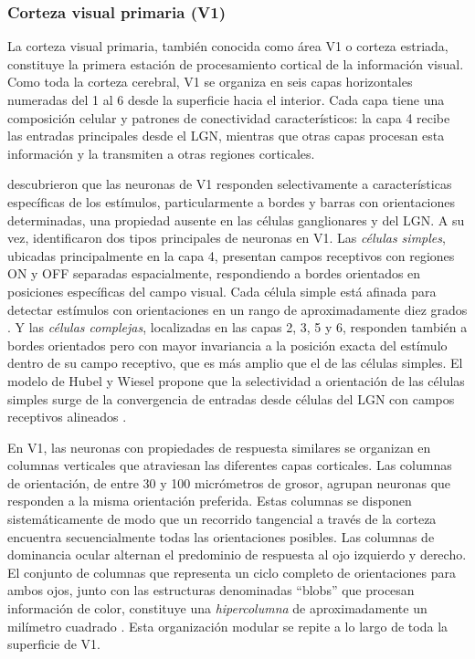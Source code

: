 \subsubsection{Corteza visual primaria (V1)}

La corteza visual primaria, también conocida como área V1 o corteza estriada, constituye la primera estación de procesamiento cortical de la información visual. Como toda la corteza cerebral, V1 se organiza en seis capas horizontales numeradas del 1 al 6 desde la superficie hacia el interior. Cada capa tiene una composición celular y patrones de conectividad característicos: la capa 4 recibe las entradas principales desde el LGN, mientras que otras capas procesan esta información y la transmiten a otras regiones corticales.

\citet{hubel1959receptive} descubrieron que las neuronas de V1 responden selectivamente a características específicas de los estímulos, particularmente a bordes y barras con orientaciones determinadas, una propiedad ausente en las células ganglionares y del \acrshort{LGN}. A su vez, identificaron dos tipos principales de neuronas en V1. Las \textit{células simples}, ubicadas principalmente en la capa 4, presentan campos receptivos con regiones ON y OFF separadas espacialmente, respondiendo a bordes orientados en posiciones específicas del campo visual. Cada célula simple está afinada para detectar estímulos con orientaciones en un rango de aproximadamente diez grados \citep{blanco2014historia}. Y las \textit{células complejas}, localizadas en las capas 2, 3, 5 y 6, responden también a bordes orientados pero con mayor invariancia a la posición exacta del estímulo dentro de su campo receptivo, que es más amplio que el de las células simples. El modelo de Hubel y Wiesel propone que la selectividad a orientación de las células simples surge de la convergencia de entradas desde células del LGN con campos receptivos alineados \citep{dayan2005theoretical}.

En V1, las neuronas con propiedades de respuesta similares se organizan en columnas verticales que atraviesan las diferentes capas corticales. Las columnas de orientación, de entre 30 y 100 micrómetros de grosor, agrupan neuronas que responden a la misma orientación preferida. Estas columnas se disponen sistemáticamente de modo que un recorrido tangencial a través de la corteza encuentra secuencialmente todas las orientaciones posibles. Las columnas de dominancia ocular alternan el predominio de respuesta al ojo izquierdo y derecho. El conjunto de columnas que representa un ciclo completo de orientaciones para ambos ojos, junto con las estructuras denominadas ``blobs'' que procesan información de color, constituye una \textit{hipercolumna} de aproximadamente un milímetro cuadrado \citep{blanco2014historia, dayan2005theoretical}. Esta organización modular se repite a lo largo de toda la superficie de V1.

